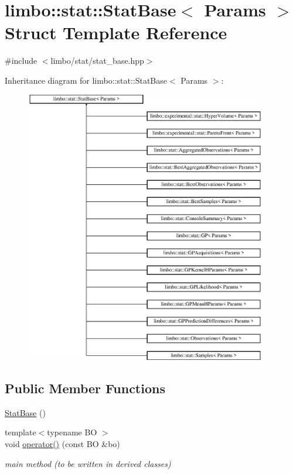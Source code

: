 \hypertarget{structlimbo_1_1stat_1_1_stat_base}{}\section{limbo\+:\+:stat\+:\+:Stat\+Base$<$ Params $>$ Struct Template Reference}
\label{structlimbo_1_1stat_1_1_stat_base}


{\ttfamily \#include $<$limbo/stat/stat\+\_\+base.\+hpp$>$}

Inheritance diagram for limbo\+:\+:stat\+:\+:Stat\+Base$<$ Params $>$\+:\begin{figure}[H]
\begin{center}
\leavevmode
\includegraphics[height=12.000000cm]{structlimbo_1_1stat_1_1_stat_base}
\end{center}
\end{figure}
\subsection*{Public Member Functions}
\begin{DoxyCompactItemize}
\item 
\hyperlink{structlimbo_1_1stat_1_1_stat_base_aac1bea59acf624ed728660823189006f}{Stat\+Base} ()
\item 
{\footnotesize template$<$typename BO $>$ }\\void \hyperlink{structlimbo_1_1stat_1_1_stat_base_a0d2a96eb80930e66a2d374160a20b040}{operator()} (const BO \&bo)
\begin{DoxyCompactList}\small\item\em main method (to be written in derived classes) \end{DoxyCompactList}\end{DoxyCompactItemize}


